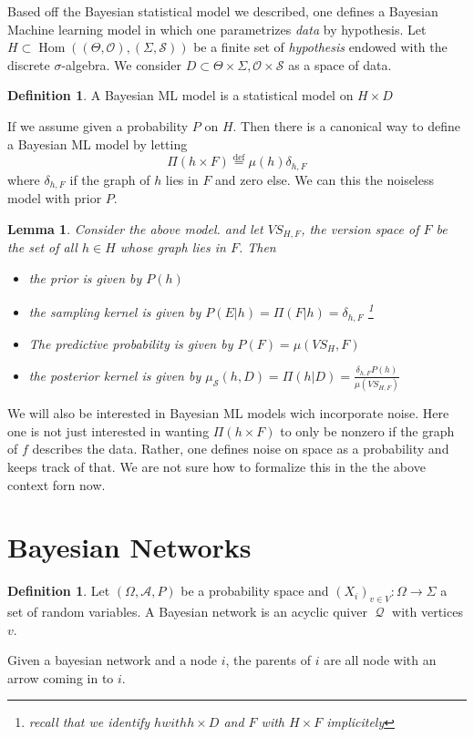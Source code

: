 \documentclass{book}
\theoremstyle{plain}
\newtheorem{lemma}[corollary]{Lemma}
\theoremstyle{definition}
\newtheorem{definition}[corollary]{Definition}
\newcommand{\define}{\stackrel{\operatorname{def}}{=}}
\DeclareMathOperator{\Hom}{Hom}
\newcommand{\mor}{\longrightarrow}
\renewcommand{\r}[1]{\mathcal{#1}}
\renewcommand{\r}[1]{\mathcal{#1}}
\DeclareMathOperator{\Qvr}{\mathcal{Q}}
\begin{document}
Based off the Bayesian statistical model we described, one defines a Bayesian Machine learning  model in which one parametrizes \emph{data} by hypothesis.
 Let $H\subset \Hom((\Theta,\r{O}),(\Sigma,\r{S}))$ be a finite set of \emph{hypothesis} endowed with the discrete $\sigma$-algebra. We consider  $D\subset \Theta\times \Sigma, \r{O}\times \r{S}$ as a space  of data.

\begin{definition}
A Bayesian ML model is a statistical model on $H\times D$	
\end{definition}


If we assume given a probability $P$ on $H$. Then there is a canonical way to define a Bayesian ML model by letting
\[
\Pi(h\times F)\define \mu(h)\delta_{h,F}
\]
where $\delta_{h,F}$ if the graph of $h$ lies in $F$ and zero else. We can this the noiseless model with prior $P$.

\begin{lemma}
Consider the above model. and let $VS_{H,F}$, the version space of $F$ be the set of all $h \in H$ whose graph lies in $F$. Then
\begin{itemize}
\item the prior is given by $P(h)$
\item the sampling kernel is given by $P(E\vert h)=\Pi(F\vert h)=\delta_{h,F}$
\footnote{recall that we identify $h with h\times D$ and $F$ with $H\times F$ implicitely}
\item The predictive probability is	given by $P(F)= \mu(VS_H,F)$

\item the posterior kernel is given by $\mu_\r{S}(h,D)=\Pi(h\vert D)=\frac{\delta_{h,F}P(h)}{\mu(VS_{H,F})}$
\end{itemize}
\end{lemma}

We will also be interested in Bayesian ML models wich incorporate noise. Here one is not just interested in wanting $\Pi(h\times F)$ to only be nonzero if the graph of $f$ describes the data. Rather, one defines noise on space as a probability and keeps track of that. We are not sure how to formalize this in the the above context forn now.

\section{Bayesian Networks}

\begin{definition}
Let $(\Omega,\r{A},P)$ be a probability space and $(X_i)_{v \in V}: \Omega\mor \Sigma$ a set of random variables.
A Bayesian network is an acyclic	 quiver  $\Qvr$ with vertices $v$.\\
\end{definition}
Given a bayesian network and a node $i$, the parents of $i$ are all node with an arrow coming in to $i$.
\end{document}
